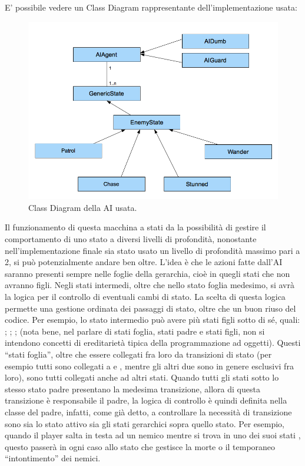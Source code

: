 E' possibile vedere un Class Diagram rappresentante dell'implementazione usata:

\begin{figure}[h]
\centerline{\includegraphics[scale=0.45]{images/development/classdiagramAI.png}}
\caption{Class Diagram della AI usata.}
\label{fig:classdiagramAI}
\end{figure}

Il funzionamento di questa macchina a stati da la possibilità di gestire il comportamento di uno stato a diversi livelli di profondità, nonostante nell'implementazione finale sia stato usato un livello di profondità massimo pari a 2, si può potenzialmente andare ben oltre.
L'idea è che le azioni fatte dall'AI saranno presenti sempre nelle foglie della gerarchia, cioè in quegli stati che non avranno figli. Negli stati intermedi, oltre che nello stato foglia medesimo, si avrà la logica per il controllo di eventuali cambi di stato.
La scelta di questa logica permette una gestione ordinata dei passaggi di stato, oltre che un buon riuso del codice. Per esempio, lo stato intermedio  può avere più stati figli sotto di sé, quali: ; ; ;  (nota bene, nel parlare di stati foglia, stati padre e stati figli, non si intendono concetti di ereditarietà tipica della programmazione ad oggetti). Questi ``stati foglia'', oltre che essere collegati fra loro da transizioni di stato (per esempio tutti sono collegati a  e , mentre gli altri due sono in genere esclusivi fra loro), sono tutti collegati anche ad altri stati. Quando tutti gli stati sotto lo stesso stato padre presentano la medesima transizione, allora di questa transizione è responsabile il padre, la logica di controllo è quindi definita nella classe del padre, infatti, come già detto, a controllare la necessità di transizione sono sia lo stato attivo sia gli stati gerarchici sopra quello stato. Per esempio, quando il player salta in testa ad un nemico mentre si trova in uno dei suoi stati , questo passerà in ogni caso allo stato  che gestisce la morte o il temporaneo ``intontimento'' dei nemici.

